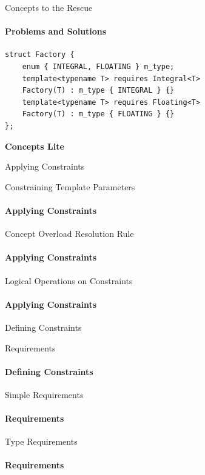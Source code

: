 \documentclass{beamer}
\begin{document}
    \begin{frame}[fragile]{Concepts to the Rescue}
        \framesubtitle{Problems and Solutions}
        \begin{center}
        \begin{lstlisting}[caption={overloading based on constraint with the \texttt{requires} clause.}]
struct Factory {
    enum { INTEGRAL, FLOATING } m_type;
    template<typename T> requires Integral<T>
    Factory(T) : m_type { INTEGRAL } {}
    template<typename T> requires Floating<T>
    Factory(T) : m_type { FLOATING } {}
}; \end{lstlisting}
        \end{center}
    \end{frame}

    \begin{frame}[fragile]{\textbf{Concepts Lite}}
    \end{frame}

    \begin{frame}[fragile]{Applying Constraints}
    \end{frame}

    \begin{frame}[fragile]{Constraining Template Parameters}
        \framesubtitle{Applying Constraints}
    \end{frame}

    \begin{frame}[fragile]{Concept Overload Resolution Rule}
        \framesubtitle{Applying Constraints}
    \end{frame}

    \begin{frame}[fragile]{Logical Operations on Constraints}
        \framesubtitle{Applying Constraints}
    \end{frame}

    \begin{frame}[fragile]{Defining Constraints}
    \end{frame}

    \begin{frame}[fragile]{Requirements}
        \framesubtitle{Defining Constraints}
    \end{frame}

    \begin{frame}[fragile]{Simple Requirements}
        \framesubtitle{Requirements}
    \end{frame}

    \begin{frame}[fragile]{Type Requirements}
        \framesubtitle{Requirements}
    \end{frame}
\end{document}

